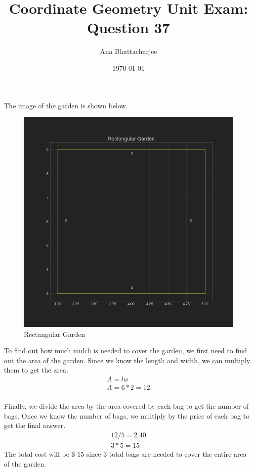 \documentclass{article}
\begin{document}
\title{Coordinate Geometry Unit Exam: Question 37}
\author{Ana Bhattacharjee}
\date{\today}
\maketitle{}

\begin{center}
  The image of the garden is shown below.
  \begin{figure}[!htbp]
    \includegraphics[width=1.0\columnwidth]{q37_figure}
    \caption{Rectangular Garden}
  \end{figure}
  \par
  To find out how much mulch is needed to cover the garden, we first need to find out the area of the garden. Since we know the length and width, we can multiply them to get the area.
  \begin{align}
    A = lw \\
    A = 6 * 2 = 12 \\
  \end{align}
  \par
  Finally, we divide the area by the area covered by each bag to get the number of bags. Once we know the number of bags, we multiply by the price of each bag to get the final answer.
  \begin{align}
    12 / 5 = 2.40 \\
    3 * 5 = 15
  \end{align}
  The total cost will be \$ 15 since 3 total bags are needed to cover the entire area of the garden.
\end{center}
\end{document}
